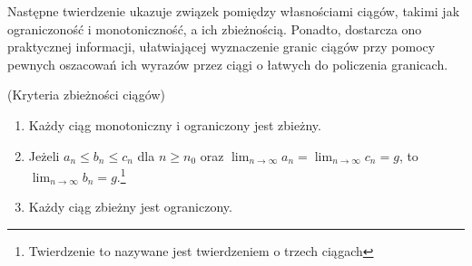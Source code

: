 Następne twierdzenie ukazuje związek pomiędzy własnościami ciągów, takimi jak ograniczoność i monotoniczność, a ich zbieżnością. Ponadto, dostarcza ono praktycznej informacji, ułatwiającej wyznaczenie granic ciągów przy pomocy pewnych oszacowań ich wyrazów przez ciągi o łatwych do policzenia granicach.
\begin{twierdzenie}\label{kryteria}(Kryteria zbieżności ciągów)
\begin{enumerate}
\item Każdy ciąg monotoniczny i ograniczony jest zbieżny.
\item Jeżeli $a_n\leq b_n\leq c_n$ dla $n\geq n_0$ oraz $\lim_{n \to \infty}{a_n}=\lim_{n \to \infty}{c_n}=g$, to\\ $\lim_{n \to \infty}{b_n}=g$.\footnote{Twierdzenie to nazywane jest twierdzeniem o trzech ciągach}
\item Każdy ciąg zbieżny jest ograniczony.
\end{enumerate}
\end{twierdzenie}
